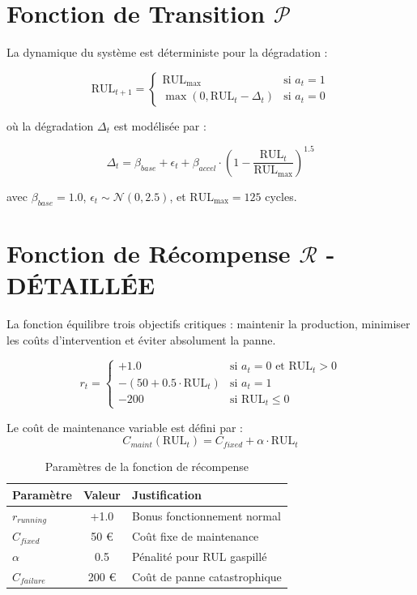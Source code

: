 \documentclass[11pt,a4paper]{report}
\begin{document}
\section{Fonction de Transition $\mathcal{P}$}
La dynamique du système est déterministe pour la dégradation :
\begin{eqbox}
\[
\text{RUL}_{t+1} = \begin{cases}
\text{RUL}_{\max} & \text{si } a_t = 1 \\
\max(0, \text{RUL}_t - \Delta_t) & \text{si } a_t = 0
\end{cases}
\]
\end{eqbox}
où la dégradation $\Delta_t$ est modélisée par :
\begin{eqbox}
\[
\Delta_t = \beta_{base} + \epsilon_t + \beta_{accel} \cdot \left(1 - \frac{\text{RUL}_t}{\text{RUL}_{\max}}\right)^{1.5}
\]
\end{eqbox}
avec $\beta_{base} = 1.0$, $\epsilon_t \sim \mathcal{N}(0, 2.5)$, et $\text{RUL}_{\max} = 125$ cycles.

\section{Fonction de Récompense $\mathcal{R}$ - DÉTAILLÉE}

\begin{infobox}
La fonction équilibre trois objectifs critiques : maintenir la production, minimiser les coûts d'intervention et éviter absolument la panne.
\end{infobox}

\begin{eqbox}
\[
r_t = \begin{cases}
+1.0 & \text{si } a_t = 0 \text{ et RUL}_t > 0 \\
-(50 + 0.5 \cdot \text{RUL}_t) & \text{si } a_t = 1 \\
-200 & \text{si RUL}_t \leq 0
\end{cases}
\]
\end{eqbox}

Le coût de maintenance variable est défini par :
\[ C_{maint}(\text{RUL}_t) = C_{fixed} + \alpha \cdot \text{RUL}_t \]

\begin{table}[h]
\centering
\begin{tabular}{lcl}
\toprule
\rowcolor{mainblue} \color{white}\textbf{Paramètre} & \color{white}\textbf{Valeur} & \color{white}\textbf{Justification} \\ \midrule
$r_{running}$ & +1.0 & Bonus fonctionnement normal \\
$C_{fixed}$ & 50 € & Coût fixe de maintenance \\
$\alpha$ & 0.5 & Pénalité pour RUL gaspillé \\
$C_{failure}$ & 200 € & Coût de panne catastrophique \\ \bottomrule
\end{tabular}
\caption{Paramètres de la fonction de récompense}
\end{table}
\end{document}
